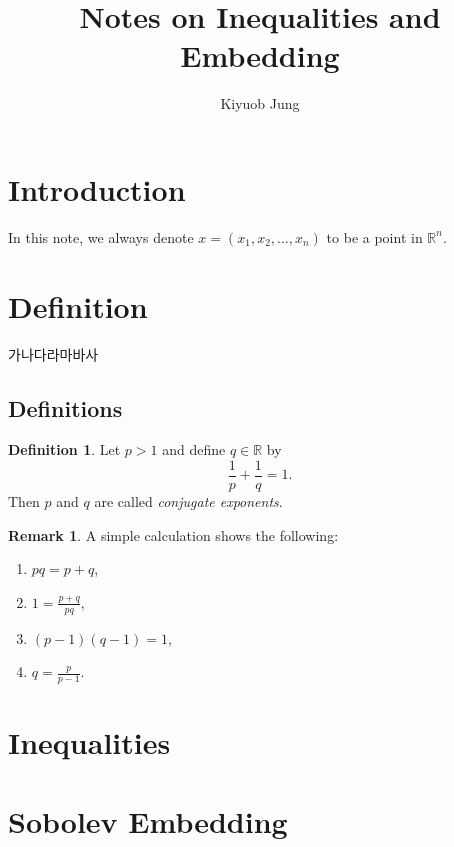 \documentclass[a4paper,11pt]{article}
\title{
Notes on Inequalities and Embedding}
\author{
Kiyuob Jung}
\theoremstyle{definition}
\newtheorem{definition}[theorem]{Definition}
\newtheorem{remark}[theorem]{Remark}
\begin{document}
\date{}
\maketitle



\section{Introduction}

In this note, we always denote $x=(x_1, x_2, \ldots, x_n)$ to be a point in $\mathbb{R}^{n}$.

\section{Definition}

가나다라마바사

\subsection{Definitions}

\begin{definition}
    Let $p>1$ and define $q \in \mathbb{R}$ by 
    \begin{equation*} 
        \frac{1}{p} + \frac{1}{q} = 1.
    \end{equation*}
    Then $p$ and $q$ are called \emph{conjugate exponents}.
\end{definition}

\begin{remark}
    A simple calculation shows the following:
    \begin{enumerate}[label=(\roman*)] 
    \rm\item $pq = p + q$,
    \rm\item $\displaystyle 1 = \frac{p+q}{pq}$,
    \rm\item $(p-1)(q-1)=1$,
    \rm\item $\displaystyle q= \frac{p}{p-1}$.
    \end{enumerate}
\end{remark}

\section{Inequalities}

\section{Sobolev Embedding}
\end{document}

